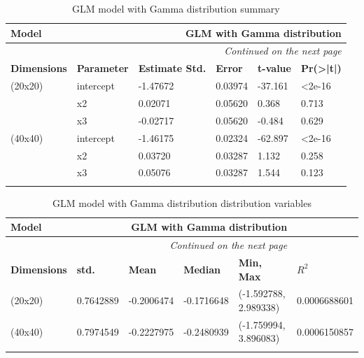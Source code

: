 \documentclass[12pt,a4paper,twoside]{article}
\begin{document}
\begin{longtable}{l|p{}|p{}|p{}|p{}|p{}}
	\textbf{Model} & \multicolumn{5}{r}{GLM with Gamma distribution}                                                             \\
	\hline
	\endhead
	\hline
	\multicolumn{6}{r}{\emph{Continued on the next page}}                                                                        \\
	\endfoot
	\hline
	\endlastfoot
	\hline
	\textbf{Dimensions} & \textbf{Parameter} & \textbf{Estimate Std.}   & \textbf{Error}  & \textbf{t-value} & \textbf{Pr(>|t|)} \\
    \hline
	(20x20)             & intercept          & -1.47672                 &  0.03974        & -37.161          &  <2e-16           \\
                        & x2                 &  0.02071                 &  0.05620        &  0.368           &  0.713            \\
                        & x3                 & -0.02717                 &  0.05620        & -0.484           &  0.629            \\
    \hline
    (40x40)             & intercept          & -1.46175                 &  0.02324        & -62.897          &  <2e-16           \\
                        & x2                 &  0.03720                 &  0.03287        &  1.132           &  0.258            \\
                        & x3                 &  0.05076                 &  0.03287        &  1.544           &  0.123            \\
    \caption{GLM model with Gamma distribution summary}
	\label{tab:gammasumtab}
\end{longtable}

\begin{longtable}{l|p{}|p{}|p{}|p{}|p{}}
	\textbf{Model} & \multicolumn{4}{r}{GLM with Gamma distribution } \\
	\hline
	\endhead
	\hline
	\multicolumn{5}{r}{\emph{Continued on the next page}} \\
	\endfoot
	\hline
	\endlastfoot
	\hline
	\textbf{Dimensions} & \textbf{std.}        & \textbf{Mean}        & \textbf{Median}        & \textbf{Min, Max}            & \textbf{$R^2$} \\
    \hline
    (20x20)             & \small 0.7642889     & \small -0.2006474    & \small -0.1716648      & \small (-1.592788, 2.989338) & 0.0006688601   \\
    \hline
    (40x40)             & \small 0.7974549     & \small -0.2227975    & \small -0.2480939      & \small (-1.759994, 3.896083) & 0.0006150857   \\
	\caption{GLM model with Gamma distribution distribution variables}
	\label{tab:gammavaltab}
\end{longtable}
\end{document}

